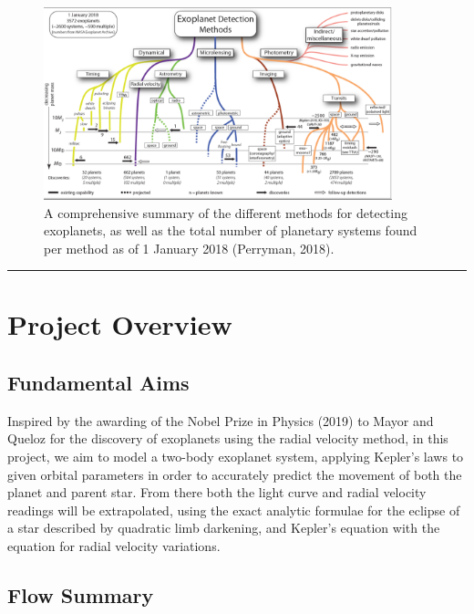 \documentclass[11pt]{article}
\begin{document}
\quad
\begin{figure}[!ht]
	\centering 
	\includegraphics[width=0.9\textwidth]{../images/Detection.png}
	\caption{A comprehensive summary of the different methods for detecting
		exoplanets, as well as the total number of planetary systems found per
		method as of 1 January 2018 (Perryman, 2018).} \label{Figure 1.b}
\end{figure}


\begin{center}\rule{0.5\linewidth}{0.5pt}\end{center}

    \hypertarget{project-overview}{%
\section{Project Overview}\label{project-overview}}


\hypertarget{fundamental-aims}{%
\subsection{Fundamental Aims}\label{fundamental-aims}}

Inspired by the awarding of the Nobel Prize in Physics (2019) to Mayor
and Queloz for the discovery of exoplanets using the radial velocity
method, in this project, we aim to model a two-body exoplanet system,
applying Kepler's laws to given orbital parameters in order to
accurately predict the movement of both the planet and parent star. From
there both the light curve and radial velocity readings will be
extrapolated, using the exact analytic formulae for the eclipse of a
star described by quadratic limb darkening, and Kepler's equation with
the equation for radial velocity variations.

\hypertarget{flow-summary}{%
\subsection{Flow Summary}\label{flow-summary}}
\end{document}
